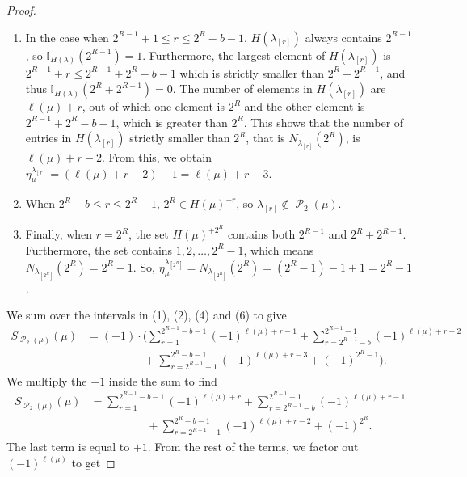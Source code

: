\documentclass[12pt]{amsart}
\theoremstyle{definition}
\numberwithin{equation}{section}
\newcommand{\la}{\lambda}
\DeclareMathOperator{\p}{\mathcal{P}}
\begin{document}
\begin{proof}
\begin{enumerate}
\item In the case when $2^{R-1} + 1 \leq r \leq 2^{R}-b-1$, $H(\lambda_{[r]})$ always contains $2^{R-1}$, so $\mathbb{I}_{H(\lambda)}(2^{R-1}) = 1$. Furthermore, the largest element of $H(\la_{[r]})$ is $2^{R-1} + r\leq 2^{R-1} + 2^R - b -1$ which is strictly smaller than $2^R + 2^{R-1}$, and thus $\mathbb{I}_{H(\lambda)}(2^R +2^{R-1}) = 0$. The number of elements in $H(\la_{[r]})$ are $\ell(\mu) + r$, out of which one element is $2^R$ and the other element is $2^{R-1} + 2^{R} - b - 1$, which is greater than $2^R$. This shows that the number of entries in $H(\la_{[r]})$ strictly smaller than $2^R$, that is $N_{\la_{[r]}}(2^R)$, is $\ell(\mu) + r - 2$. From this, we obtain $\eta^{\lambda_{[r]}}_\mu = (\ell(\mu)+r -2) - 1 = \ell(\mu) + r - 3$.

\item When $2^R - b \leq r \leq 2^{R}-1$, $2^{R}\in H(\mu)^{+r}$, so $\lambda_{[r]}\not\in \p_2(\mu)$.
\item Finally, when $r = 2^R$, the set $H(\mu)^{+2^R}$ contains both $2^{R-1}$ and $2^R + 2^{R-1}$. Furthermore, the set contains $1,2,\ldots, 2^{R}-1$, which means $N_{\la_{[2^R]}}(2^R) = 2^R - 1$.
So, $\eta_{\mu}^{\lambda_{[2^R]}} = N_{\lambda_{[2^R]}}(2^R) = (2^{R} - 1) -1 + 1 = 2^R -1$.
\end{enumerate}

We sum over the intervals in (1), (2), (4) and (6) to give
\begin{align*}
S_{\p_2(\mu)}({\mu}) &= (-1)\cdot\Bigg(\sum\limits_{r = 1}^{2^{R-1}-b-1} (-1)^{\ell(\mu)+r-1} + \sum\limits_{r = 2^{R-1}-b}^{2^{R-1}-1} (-1)^{\ell(\mu)+r-2} \\ 
&\qquad\qquad\quad+ \sum\limits_{r=2^{R-1} +1}^{2^{R}-b-1} (-1)^{\ell(\mu)+r - 3} + (-1)^{2^R - 1}\Bigg).
\end{align*}
We multiply the $-1$ inside the sum to find
\begin{align*}
S_{\p_2(\mu)}({\mu}) &= \sum\limits_{r = 1}^{2^{R-1}-b-1} (-1)^{\ell(\mu)+r} + \sum\limits_{r = 2^{R-1}-b}^{2^{R-1}-1} (-1)^{\ell(\mu)+r-1} \\ 
&\qquad\qquad\quad+ \sum\limits_{r=2^{R-1} +1}^{2^{R}-b-1} (-1)^{\ell(\mu)+r - 2} + (-1)^{2^R}.
\end{align*}
The last term is equal to $+1$. From the rest of the terms, we factor out $(-1)^{\ell(\mu)}$ to get


\end{proof}
\end{document}
